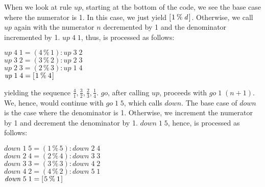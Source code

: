\documentclass[tikz]{scrreprt}
\newcommand{\Varid}[1]{\mathit{#1}}
\begin{document}
When we look at rule \ensuremath{\Varid{up}}, starting at the bottom
of the code, we see the base case where the numerator
is 1. In this case, we just yield \ensuremath{[\mskip1.5mu \mathrm{1}\mathbin{\%}\Varid{d}\mskip1.5mu]}.
Otherwise, we call \ensuremath{\Varid{up}} again with the numerator \ensuremath{\Varid{n}}
decremented by 1 and the denominator incremented by 1.
\ensuremath{\Varid{up}\;\mathrm{4}\;\mathrm{1}}, thus, is processed as follows:

\begin{minipage}{\textwidth}
\ensuremath{\Varid{up}\;\mathrm{4}\;\mathrm{1}\mathrel{=}(\mathrm{4}\mathbin{\%}\mathrm{1})\mathbin{:}\Varid{up}\;\mathrm{3}\;\mathrm{2}}\\
\ensuremath{\Varid{up}\;\mathrm{3}\;\mathrm{2}\mathrel{=}(\mathrm{3}\mathbin{\%}\mathrm{2})\mathbin{:}\Varid{up}\;\mathrm{2}\;\mathrm{3}}\\
\ensuremath{\Varid{up}\;\mathrm{2}\;\mathrm{3}\mathrel{=}(\mathrm{2}\mathbin{\%}\mathrm{3})\mathbin{:}\Varid{up}\;\mathrm{1}\;\mathrm{4}}\\
\ensuremath{\Varid{up}\;\mathrm{1}\;\mathrm{4}\mathrel{=}[\mskip1.5mu \mathrm{1}\mathbin{\%}\mathrm{4}\mskip1.5mu]}
\end{minipage}

yielding the sequence
$\frac{4}{1}, 
 \frac{3}{2}, 
 \frac{2}{3}, 
 \frac{1}{4}$. 
\ensuremath{\Varid{go}}, after calling \ensuremath{\Varid{up}}, proceeds with 
\ensuremath{\Varid{go}\;\mathrm{1}\;(\Varid{n}\mathbin{+}\mathrm{1})}.
We, hence, would continue with 
\ensuremath{\Varid{go}\;\mathrm{1}\;\mathrm{5}}, which calls \ensuremath{\Varid{down}}.
The base case of \ensuremath{\Varid{down}} is the case
where the denominator is 1.
Otherwise, we increment the numerator by 1
and decrement the denominator by 1.
\ensuremath{\Varid{down}\;\mathrm{1}\;\mathrm{5}}, hence, is processed as follows:

\begin{minipage}{\textwidth}
\ensuremath{\Varid{down}\;\mathrm{1}\;\mathrm{5}\mathrel{=}(\mathrm{1}\mathbin{\%}\mathrm{5})\mathbin{:}\Varid{down}\;\mathrm{2}\;\mathrm{4}}\\
\ensuremath{\Varid{down}\;\mathrm{2}\;\mathrm{4}\mathrel{=}(\mathrm{2}\mathbin{\%}\mathrm{4})\mathbin{:}\Varid{down}\;\mathrm{3}\;\mathrm{3}}\\
\ensuremath{\Varid{down}\;\mathrm{3}\;\mathrm{3}\mathrel{=}(\mathrm{3}\mathbin{\%}\mathrm{3})\mathbin{:}\Varid{down}\;\mathrm{4}\;\mathrm{2}}\\
\ensuremath{\Varid{down}\;\mathrm{4}\;\mathrm{2}\mathrel{=}(\mathrm{4}\mathbin{\%}\mathrm{2})\mathbin{:}\Varid{down}\;\mathrm{5}\;\mathrm{1}}\\
\ensuremath{\Varid{down}\;\mathrm{5}\;\mathrm{1}\mathrel{=}[\mskip1.5mu \mathrm{5}\mathbin{\%}\mathrm{1}\mskip1.5mu]}
\end{minipage}
\end{document}
